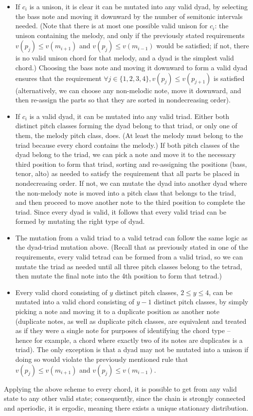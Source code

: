 \documentclass[twoside]{article}
\begin{document}
	\begin{itemize}
		\item
		If $c_i$ is a unison, it is clear it can be mutated into any valid dyad, by selecting the bass note and moving it downward by the number of semitonic intervals needed. (Note that there is at most one possible valid unison for $c_i$: the unison containing the melody, and only if the previously stated requirements $v(p_j) \leq v(m_{i+1})$ and $v(p_j) \leq v(m_{i-1})$ would be satisfied; if not, there is no valid unison chord for that melody, and a dyad is the simplest valid chord.) Choosing the bass note and moving it downward to form a valid dyad ensures that the requirement $\forall j \in \{1,2,3,4\}, v(p_j) \leq v(p_{j+1})$ is satisfied (alternatively, we can choose any non-melodic note, move it downward, and then re-assign the parts so that they are sorted in nondecreasing order).
		\item
		If $c_i$ is a valid dyad, it can be mutated into any valid triad. Either both distinct pitch classes forming the dyad belong to that triad, or only one of them, the melody pitch class, does. (At least the melody must belong to the triad because every chord contains the melody.) If both pitch classes of the dyad belong to the triad, we can pick a note and move it to the necessary third position to form that triad, sorting and re-assigning the positions (bass, tenor, alto) as needed to satisfy the requirement that all parts be placed in nondecreasing order. If not, we can mutate the dyad into another dyad where the non-melody note is moved into a pitch class that belongs to the triad, and then proceed to move another note to the third position to complete the triad. Since every dyad is valid, it follows that every valid triad can be formed by mutating the right type of dyad.
		\item
		The mutation from a valid triad to a valid tetrad can follow the same logic as the dyad-triad mutation above. (Recall that as previously stated in one of the requirements, every valid tetrad can be formed from a valid triad, so we can mutate the triad as needed until all three pitch classes belong to the tetrad, then mutate the final note into the 4th position to form that tetrad.)
		\item
		Every valid chord consisting of $y$ distinct pitch classes, $2 \leq y \leq 4$, can be mutated into a valid chord consisting of $y-1$ distinct pitch classes, by simply picking a note and moving it to a duplicate position as another note (duplicate notes, as well as duplicate pitch classes, are equivalent and treated as if they were a single note for purposes of identifying the chord type -- hence for example, a chord where exactly two of its notes are duplicates is a triad). The only exception is that a dyad may not be mutated into a unison if doing so would violate the previously mentioned rule that $v(p_j) \leq v(m_{i+1})$ and $v(p_j) \leq v(m_{i-1})$.
	\end{itemize}
	Applying the above scheme to every chord, it is possible to get from any valid state to any other valid state; consequently, since the chain is strongly connected and aperiodic, it is ergodic, meaning there exists a unique stationary distribution.
\end{document}
